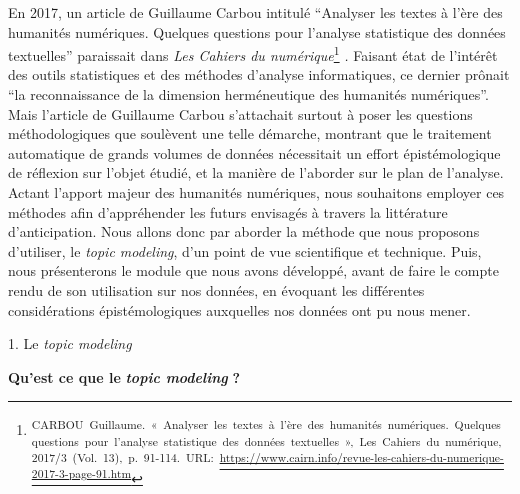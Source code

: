 \documentclass[letterpaper,portrait,12pt]{article}
\begin{document}
	En 2017, un article de Guillaume Carbou intitul\'{e} {``}Analyser les textes \`{a} l'\`{e}re des humanit\'{e}s num\'{e}riques. Quelques questions pour l'analyse statistique des donn\'{e}es textuelles'' paraissait dans \emph{Les Cahiers du num\'{e}rique}\footnote{\textsuperscript{\newpage
}\textsuperscript{	}\textsuperscript{{\tiny CARBOU\ Guillaume.\ «\ Analyser\ les\ textes\ \`{a}\ l'\`{e}re\ des\ humanit\'{e}s\ num\'{e}riques.\ Quelques\ questions\ pour\ l'analyse\ statistique\ des\ donn\'{e}es\ textuelles\ »,\ Les\ Cahiers\ du\ num\'{e}rique,\ 2017/3\ (Vol.\ 13),\ p.\ 91-114.\ URL:\ }}\href{https://www.cairn.info/revue-les-cahiers-du-numerique-2017-3-page-91.htm}{\textsuperscript{\textcolor[rgb]{0.000,0.082,0.361}{{\tiny \uline{https://www.cairn.info/revue-les-cahiers-du-numerique-2017-3-page-91.htm}}}}}} \emph{. }Faisant \'{e}tat de l'int\'{e}r\^{e}t des outils statistiques et des m\'{e}thodes d'analyse informatiques, ce dernier pr\^{o}nait {``}la reconnaissance de la dimension herm\'{e}neutique des humanit\'{e}s num\'{e}riques''. Mais l'article de Guillaume Carbou s'attachait surtout \`{a} poser les questions m\'{e}thodologiques que soul\`{e}vent une telle d\'{e}marche, montrant que le traitement automatique de grands volumes de donn\'{e}es n\'{e}cessitait un effort \'{e}pist\'{e}mologique de r\'{e}flexion sur l'objet \'{e}tudi\'{e}, et la mani\`{e}re de l'aborder sur le plan de l'analyse. Actant l'apport majeur des humanit\'{e}s num\'{e}riques, nous souhaitons employer ces m\'{e}thodes afin d'appr\'{e}hender les futurs envisag\'{e}s \`{a} travers la litt\'{e}rature d'anticipation. Nous allons donc par aborder la m\'{e}thode que nous proposons d'utiliser, le \emph{topic modeling}, d'un point de vue scientifique et technique. Puis, nous pr\'{e}senterons le module que nous avons d\'{e}velopp\'{e}, avant de faire le compte rendu de son utilisation sur nos donn\'{e}es, en \'{e}voquant les diff\'{e}rentes consid\'{e}rations \'{e}pist\'{e}mologiques auxquelles nos donn\'{e}es ont pu nous mener.








1. Le \emph{topic modeling}








\textbf{	Qu'est ce que le }\textbf{\emph{topic modeling}}\textbf{ ?}
\end{document}
